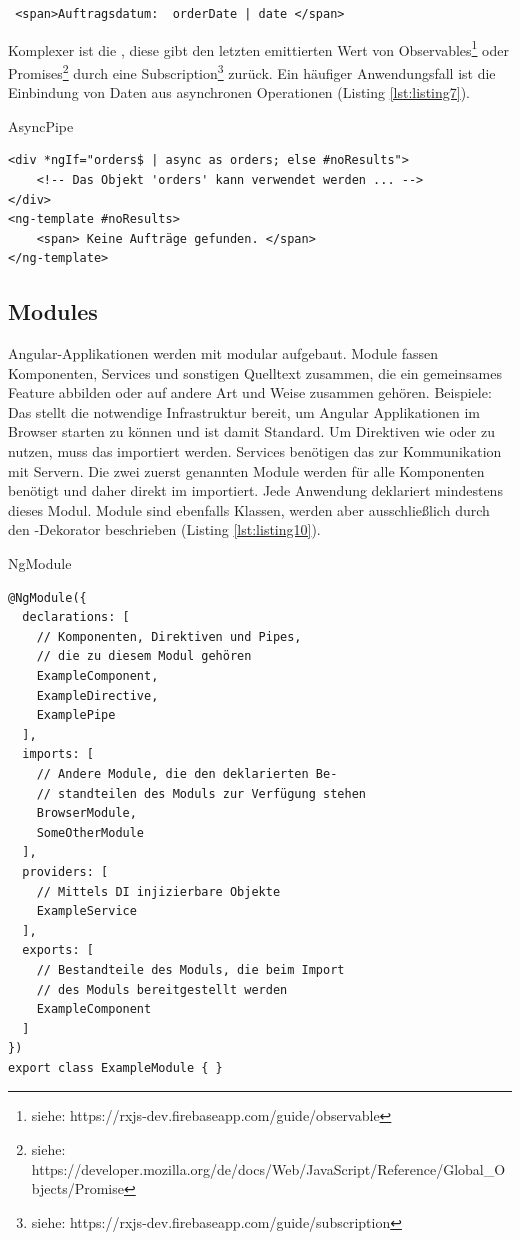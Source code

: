 \texttt{
<span>Auftragsdatum: {{ orderDate | date }}</span>
}

Komplexer ist die , 
diese gibt den letzten emittierten Wert von Observables\footnote{siehe: https://rxjs-dev.firebaseapp.com/guide/observable} 
oder Promises\footnote{siehe: https://developer.mozilla.org/de/docs/Web/JavaScript/Reference/Global\_Objects/Promise} 
durch eine Subscription\footnote{siehe: https://rxjs-dev.firebaseapp.com/guide/subscription} zurück. 
Ein häufiger Anwendungsfall ist die Einbindung von Daten aus asynchronen Operationen (Listing \ref{lst:listing7}).\cite{AsyncPipe}

\begin{listing}
\caption{AsyncPipe}
\label{lst:listing9}
\begin{verbatim}
<div *ngIf="orders$ | async as orders; else #noResults">
    <!-- Das Objekt 'orders' kann verwendet werden ... -->
</div>
<ng-template #noResults>
    <span> Keine Aufträge gefunden. </span>
</ng-template>
\end{verbatim}
\end{listing}

\subsection{Modules}
Angular-Applikationen werden mit  modular aufgebaut. Module fassen Komponenten, Services und sonstigen Quelltext zusammen, die ein gemeinsames Feature abbilden oder auf andere Art und Weise zusammen gehören. Beispiele: Das  stellt die notwendige Infrastruktur bereit, um Angular Applikationen im Browser starten zu können und ist damit Standard. Um Direktiven wie  oder  zu nutzen, muss das  importiert werden. Services benötigen das  zur Kommunikation mit Servern. Die zwei zuerst genannten Module werden für alle Komponenten benötigt und daher direkt im  importiert. Jede Anwendung deklariert mindestens dieses Modul. Module sind ebenfalls Klassen, werden aber ausschließlich durch den -Dekorator beschrieben (Listing \ref{lst:listing10}).\cite{NgModule}

\begin{listing}
\caption{NgModule}
\label{lst:listing10}
\begin{verbatim}
@NgModule({
  declarations: [
    // Komponenten, Direktiven und Pipes,
    // die zu diesem Modul gehören
    ExampleComponent,
    ExampleDirective,
    ExamplePipe
  ],
  imports: [ 
    // Andere Module, die den deklarierten Be-
    // standteilen des Moduls zur Verfügung stehen
    BrowserModule,
    SomeOtherModule
  ],
  providers: [
    // Mittels DI injizierbare Objekte
    ExampleService
  ],
  exports: [
    // Bestandteile des Moduls, die beim Import
    // des Moduls bereitgestellt werden
    ExampleComponent
  ]
})
export class ExampleModule { }
\end{verbatim}
\end{listing}

